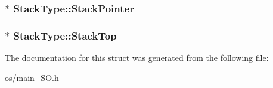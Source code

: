 \subsubsection[{Stack\+Pointer}]{$\ast$ Stack\+Type\+::\+Stack\+Pointer}\label{struct_stack_type_a10eceda97205d97a0a28b07755e47dba}
\hypertarget{struct_stack_type_a88c18557bed6c07dceb550560d9ea98f}{}
\subsubsection[{Stack\+Top}]{$\ast$ Stack\+Type\+::\+Stack\+Top}\label{struct_stack_type_a88c18557bed6c07dceb550560d9ea98f}


The documentation for this struct was generated from the following file\+:\begin{DoxyCompactItemize}
\item 
os/\hyperlink{main___s_o_8h}{main\+\_\+\+S\+O.\+h}\end{DoxyCompactItemize}
